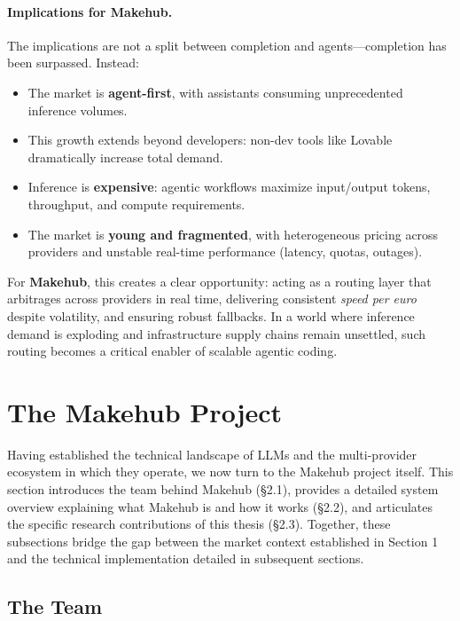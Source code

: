 \documentclass[english]{article}
\begin{document}
\paragraph{Implications for Makehub.}
The implications are not a split between completion and agents—completion has been surpassed. 
Instead:
\begin{itemize}
  \item The market is \textbf{agent-first}, with assistants consuming unprecedented inference volumes.
  \item This growth extends beyond developers: non-dev tools like Lovable dramatically increase total demand.
  \item Inference is \textbf{expensive}: agentic workflows maximize input/output tokens, throughput, and compute requirements.
  \item The market is \textbf{young and fragmented}, with heterogeneous pricing across providers and unstable real-time performance (latency, quotas, outages).
\end{itemize}
For \textbf{Makehub}, this creates a clear opportunity: acting as a routing layer that arbitrages across providers in real time, delivering consistent \textit{speed per euro} despite volatility, and ensuring robust fallbacks. In a world where inference demand is exploding and infrastructure supply chains remain unsettled, such routing becomes a critical enabler of scalable agentic coding.



\newpage
\section{The Makehub Project}

Having established the technical landscape of LLMs and the multi-provider ecosystem in which they operate, we now turn to the Makehub project itself. This section introduces the team behind Makehub (§2.1), provides a detailed system overview explaining what Makehub is and how it works (§2.2), and articulates the specific research contributions of this thesis (§2.3). Together, these subsections bridge the gap between the market context established in Section 1 and the technical implementation detailed in subsequent sections.

\subsection{The Team}
\end{document}
